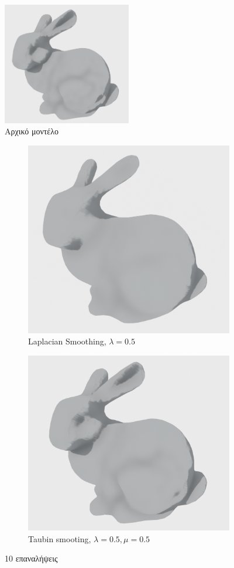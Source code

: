 \documentclass{article}
\begin{document}
\begin{figure}[h]
	\center
	\includegraphics[width=0.5\textwidth]{"1.png"}
	\caption{Αρχικό μοντέλο}
\end{figure}
\begin{figure}[h]
	\begin{subfigure}{0.5\textwidth}
		\includegraphics[width=0.9\linewidth]{"2.png"}
		\caption{Laplacian Smoothing, $\lambda = 0.5$}
	\end{subfigure}
	\begin{subfigure}{0.5\textwidth}
		\includegraphics[width=0.9\linewidth]{"3.png"}
		\caption{Taubin smooting, $\lambda = 0.5, \mu = 0.5$}
	\end{subfigure}
	\caption{10 επαναλήψεις}
\end{figure}
\end{document}
